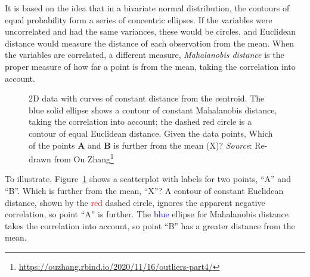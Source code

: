 \documentclass[
  letterpaper,
  10pt,
  krantz2]{krantz}
\providecommand{\href}[2]{#2\footnote{\url{#1}}}
\begin{document}
It is based on the idea that in a bivariate normal distribution, the
contours of equal probability form a series of concentric ellipses. If
the variables were uncorrelated and had the same variances, these would
be circles, and Euclidean distance would measure the distance of each
observation from the mean. When the variables are correlated, a
different measure, \emph{Mahalanobis distance} is the proper measure of
how far a point is from the mean, taking the correlation into account.

\begin{figure}


\caption{\label{fig-mahalanobis}2D data with curves of constant distance
from the centroid. The blue solid ellipse shows a contour of constant
Mahalanobis distance, taking the correlation into account; the dashed
red circle is a contour of equal Euclidean distance. Given the data
points, Which of the points \textbf{A} and \textbf{B} is further from
the mean (X)? \emph{Source}: Re-drawn from
\href{https://ouzhang.rbind.io/2020/11/16/outliers-part4/}{Ou Zhang}}

\end{figure}%

To illustrate, Figure~\ref{fig-mahalanobis} shows a scatterplot with
labels for two points, ``A'' and ``B''. Which is further from the mean,
``X''? A contour of constant Euclidean distance, shown by the
\textcolor{red}{red} dashed circle, ignores the apparent negative
correlation, so point ``A'' is further. The \textcolor{blue}{blue}
ellipse for Mahalanobis distance takes the correlation into account, so
point ``B'' has a greater distance from the mean.
\end{document}
